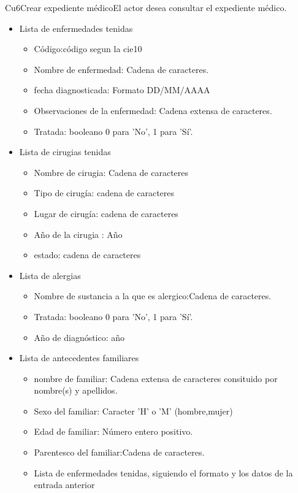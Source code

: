 \begin{UseCase}{Cu6}{Crear expediente médico}{El actor desea consultar el expediente médico.}
{\begin{itemize}
\begin{itemize}
		\end{itemize}
         
       \item Lista de enfermedades tenidas
        \begin{itemize}
            \item Código:código segun la cie10
            \item Nombre de enfermedad: Cadena de caracteres. 
            \item fecha diagnosticada: Formato DD/MM/AAAA
            \item Observaciones de la enfermedad: Cadena extensa de caracteres.
            \item Tratada: booleano 0 para 'No', 1 para 'Sí'.

        \end{itemize}
        
        \item Lista de cirugias tenidas
        \begin{itemize}
            \item Nombre de cirugia: Cadena de caracteres
            \item Tipo de cirugía: cadena de caracteres
            \item Lugar de cirugía: cadena de caracteres
            \item Año de la cirugia : Año 
            \item estado: cadena de caracteres
        \end{itemize}
        
        \item Lista de alergias
        \begin{itemize}
            \item Nombre de sustancia a la que es alergico:Cadena de caracteres.
            \item Tratada: booleano 0 para 'No', 1 para 'Sí'.
            \item Año de diagnóstico: año
        \end{itemize}
        
  \item Lista de antecedentes familiares
        
        \begin{itemize}
            \item nombre de familiar: Cadena extensa de caracteres consituido por nombre(s) y apellidos.
            \item Sexo del familiar: Caracter 'H' o 'M' (hombre,mujer)
            \item Edad de familiar: Número entero positivo.
            \item Parentesco del familiar:Cadena de caracteres.
            \item Lista de enfermedades tenidas, siguiendo el formato y los datos de la entrada anterior


\end{itemize}
\end{itemize}}
\end{UseCase}

